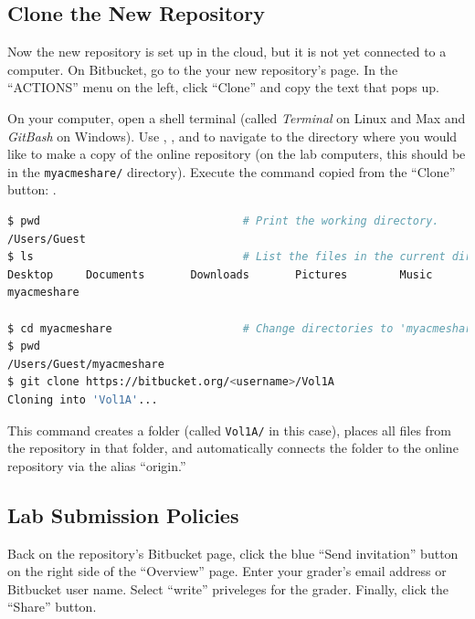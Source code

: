 \subsection*{Clone the New Repository} %

Now the new repository is set up in the cloud, but it is not yet connected to a computer.
On Bitbucket, go to the your new repository's page.
In the ``ACTIONS'' menu on the left, click ``Clone'' and copy the text that pops up. %

On your computer, open a shell terminal (called \emph{Terminal} on Linux and Max and \emph{GitBash} on Windows).
Use , , and  to navigate to the directory where you would like to make a copy of the online repository (on the lab computers, this should be in the \texttt{myacmeshare/} directory).
Execute the command copied from the ``Clone'' button:
.

\begin{lstlisting}[language=bash]
$ pwd                               # Print the working directory.
/Users/Guest
$ ls                                # List the files in the current directory.
Desktop     Documents       Downloads       Pictures        Music
myacmeshare

$ cd myacmeshare                    # Change directories to 'myacmeshare/'.
$ pwd
/Users/Guest/myacmeshare
$ git clone https://bitbucket.org/<username>/Vol1A
Cloning into 'Vol1A'...
\end{lstlisting}

This command creates a folder (called \texttt{Vol1A/} in this case), places all files from the repository in that folder, and automatically connects the folder to the online repository via the alias ``origin.''

\subsection*{Lab Submission Policies} %

Back on the repository's Bitbucket page, click the blue ``Send invitation'' button on the right side of the ``Overview'' page.
Enter your grader's email address or Bitbucket user name.
Select ``write'' priveleges for the grader.
Finally, click the ``Share'' button.

